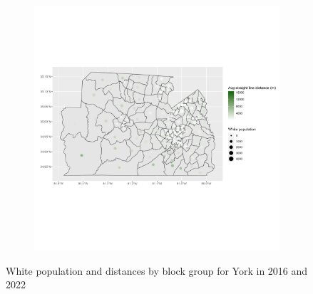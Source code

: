 \documentclass[11pt]{article}
\theoremstyle{remark}
\theoremstyle{definition}
\begin{document}
\begin{figure}
\begin{subfigure}{.5\textwidth}
		\includegraphics[width=\linewidth]{result analysis/York_SC_original_configs/white_pop_and_dist_York_config_original_2022_polls.png}
		\label{sfig:York_2022_bg_dist}
	\end{subfigure}
	\caption{White population and distances by block group for York in 2016 and 2022}
	\label{fig:York distance White population maps}
\end{figure}
\end{document}
